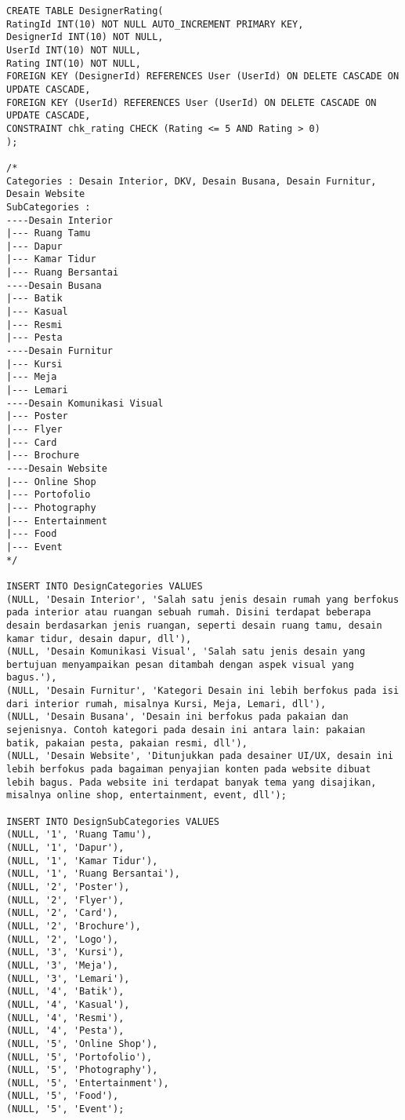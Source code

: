 \begin{lstlisting}
CREATE TABLE DesignerRating(
RatingId INT(10) NOT NULL AUTO_INCREMENT PRIMARY KEY,
DesignerId INT(10) NOT NULL,
UserId INT(10) NOT NULL,
Rating INT(10) NOT NULL,
FOREIGN KEY (DesignerId) REFERENCES User (UserId) ON DELETE CASCADE ON UPDATE CASCADE,
FOREIGN KEY (UserId) REFERENCES User (UserId) ON DELETE CASCADE ON UPDATE CASCADE,
CONSTRAINT chk_rating CHECK (Rating <= 5 AND Rating > 0)
);  

/*
Categories : Desain Interior, DKV, Desain Busana, Desain Furnitur, Desain Website
SubCategories : 
----Desain Interior
|--- Ruang Tamu
|--- Dapur
|--- Kamar Tidur
|--- Ruang Bersantai
----Desain Busana
|--- Batik
|--- Kasual
|--- Resmi
|--- Pesta
----Desain Furnitur
|--- Kursi
|--- Meja
|--- Lemari
----Desain Komunikasi Visual
|--- Poster
|--- Flyer
|--- Card
|--- Brochure
----Desain Website
|--- Online Shop
|--- Portofolio
|--- Photography
|--- Entertainment
|--- Food
|--- Event
*/

INSERT INTO DesignCategories VALUES
(NULL, 'Desain Interior', 'Salah satu jenis desain rumah yang berfokus pada interior atau ruangan sebuah rumah. Disini terdapat beberapa desain berdasarkan jenis ruangan, seperti desain ruang tamu, desain kamar tidur, desain dapur, dll'),
(NULL, 'Desain Komunikasi Visual', 'Salah satu jenis desain yang bertujuan menyampaikan pesan ditambah dengan aspek visual yang bagus.'),
(NULL, 'Desain Furnitur', 'Kategori Desain ini lebih berfokus pada isi dari interior rumah, misalnya Kursi, Meja, Lemari, dll'),
(NULL, 'Desain Busana', 'Desain ini berfokus pada pakaian dan sejenisnya. Contoh kategori pada desain ini antara lain: pakaian batik, pakaian pesta, pakaian resmi, dll'),
(NULL, 'Desain Website', 'Ditunjukkan pada desainer UI/UX, desain ini lebih berfokus pada bagaiman penyajian konten pada website dibuat lebih bagus. Pada website ini terdapat banyak tema yang disajikan, misalnya online shop, entertainment, event, dll');

INSERT INTO DesignSubCategories VALUES
(NULL, '1', 'Ruang Tamu'),
(NULL, '1', 'Dapur'),
(NULL, '1', 'Kamar Tidur'),
(NULL, '1', 'Ruang Bersantai'),
(NULL, '2', 'Poster'),
(NULL, '2', 'Flyer'),
(NULL, '2', 'Card'),
(NULL, '2', 'Brochure'),
(NULL, '2', 'Logo'),
(NULL, '3', 'Kursi'),
(NULL, '3', 'Meja'),
(NULL, '3', 'Lemari'),
(NULL, '4', 'Batik'),
(NULL, '4', 'Kasual'),
(NULL, '4', 'Resmi'),
(NULL, '4', 'Pesta'),
(NULL, '5', 'Online Shop'),
(NULL, '5', 'Portofolio'),
(NULL, '5', 'Photography'),
(NULL, '5', 'Entertainment'),
(NULL, '5', 'Food'),
(NULL, '5', 'Event');




\end{lstlisting}
